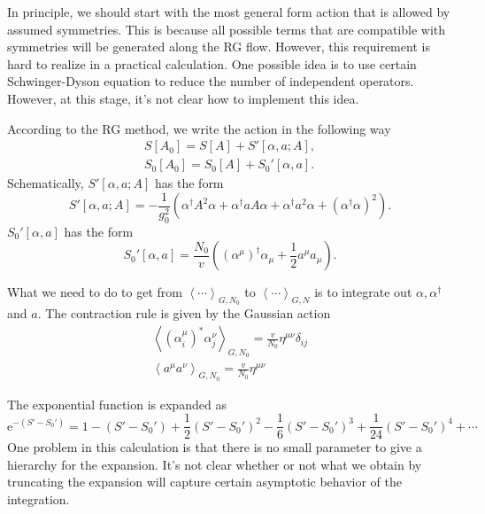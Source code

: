 In principle, we should start with the most general form action
that is allowed by assumed symmetries.
This is because all possible terms that are compatible with symmetries
will be generated along the RG flow.
However, this requirement is hard to realize in a practical calculation.
One possible idea is to use certain Schwinger-Dyson equation
to reduce the number of independent operators.
However, at this stage, it's not clear how to implement this idea.

According to the RG method, we write the action in the following way
\begin{align*}
	S[A_0] = S[A] + S'[\alpha,a;A],\\
	S_0[A_0] = S_0[A] + S_0'[\alpha,a].
\end{align*}
Schematically, $S'[\alpha,a;A]$ has the form
\[
	S'[\alpha,a;A] =- \frac{1}{g_0^2}
	\left( \alpha^\dagger A^2 \alpha + \alpha^\dagger a A \alpha
	+ \alpha^\dagger a^2 \alpha + (\alpha^\dagger \alpha)^2\right) 
.\] 
$S_0'[\alpha,a]$ has the form
\[
	S_0'[\alpha,a] = \frac{N_0}{v}
	\left( (\alpha^\mu)^\dagger \alpha_\mu + \frac{1}{2}a^\mu a_\mu\right) 
.\] 

What we need to do to get from $\left<\cdots \right>_{G,N_0}$ to
$\left<\cdots \right>_{G,N}$ is to integrate out $\alpha,\alpha^\dagger$ and $a$.
The contraction rule is given by the Gaussian action
\begin{align*}
	\left<(\alpha^\mu_i)^* \alpha^\nu_j \right>_{G,N_0} = \frac{v}{N_0}
	\eta^{\mu\nu}\delta_{ij}
	\\
	\left<a^\mu a^\nu \right>_{G,N_0} = \frac{v}{N_0}\eta^{\mu\nu}
\end{align*}

The exponential function is expanded as
\[
	\mathrm{e}^{-(S'-S_0')} = 1 - (S' - S_0') + \frac{1}{2} (S' - S_0')^2
	- \frac{1}{6} (S'- S_0')^3 + \frac{1}{24} (S' - S_0')^4 + \cdots
\]
One problem in this calculation is that there is no small parameter
to give a hierarchy for the expansion.
It's not clear whether or not what we obtain by truncating the expansion
will capture certain asymptotic behavior of the integration.

